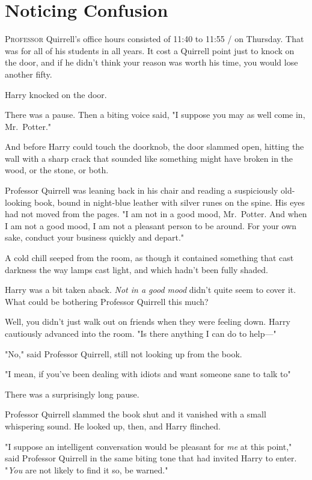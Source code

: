 \chapter{Noticing Confusion}

\lettrine{P}{rofessor} Quirrell's office hours consisted of 11:40 to 11:55 \AM/ on Thursday.
That was for all of his students in all years. It cost a Quirrell point just to
knock on the door, and if he didn't think your reason was worth his time, you
would lose another fifty.

Harry knocked on the door.

There was a pause. Then a biting voice said, "I suppose you may as well come
in, Mr.~Potter."

And before Harry could touch the doorknob, the door slammed open, hitting the
wall with a sharp crack that sounded like something might have broken in the
wood, or the stone, or both.

Professor Quirrell was leaning back in his chair and reading a suspiciously
old-looking book, bound in night-blue leather with silver runes on the spine.
His eyes had not moved from the pages. "I am not in a good mood, Mr.~Potter.
And when I am not a good mood, I am not a pleasant person to be around. For
your own sake, conduct your business quickly and depart."

A cold chill seeped from the room, as though it contained something that cast
darkness the way lamps cast light, and which hadn't been fully shaded.

Harry was a bit taken aback. \emph{Not in a good mood} didn't quite seem to
cover it. What could be bothering Professor Quirrell this much\el?

Well, you didn't just walk out on friends when they were feeling down. Harry
cautiously advanced into the room. "Is there anything I can do to help\mbox{---}"

"No," said Professor Quirrell, still not looking up from the book.

"I mean, if you've been dealing with idiots and want someone sane to talk
to{\el}"

There was a surprisingly long pause.

Professor Quirrell slammed the book shut and it vanished with a small
whispering sound. He looked up, then, and Harry flinched.

"I suppose an intelligent conversation would be pleasant for \emph{me} at this
point," said Professor Quirrell in the same biting tone that had invited Harry
to enter. "\emph{You} are not likely to find it so, be warned."

